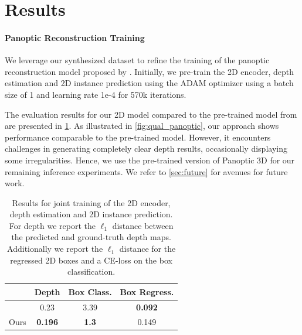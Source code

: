 \section{Results}
\label{sec:results}
\paragraph{Panoptic Reconstruction Training}

We leverage our synthesized dataset to refine the training of the panoptic reconstruction model proposed by \citet{dahnert2021panoptic}.
Initially, we pre-train the 2D encoder, depth estimation and 2D instance prediction using the ADAM optimizer \citep{kingma2014adam} using a batch size of 1 and learning rate 1e-4 for 570k iterations.

The evaluation results for our 2D model compared to the pre-trained model from \citet{dahnert2021panoptic} are presented in \cref{tab:2dresults}.
As illustrated in \cref{fig:qual_panoptic}, our approach shows performance comparable to the pre-trained model. However, it encounters challenges in generating completely clear depth results, occasionally displaying some irregularities.
Hence, we use the pre-trained version of Panoptic 3D for our remaining inference experiments. We refer to \cref{sec:future} for avenues for future work.
\begin{table}
  \centering
  \begin{tabular}{@{}lccc@{}}
    \toprule
     & Depth & Box Class. & Box Regress. \\
    \midrule
    \citet{dahnert2021panoptic} & 0.23 & 3.39 & \textbf{0.092}\\
    Ours & \textbf{0.196} & \textbf{1.3} & 0.149 \\
    \bottomrule
  \end{tabular}
  \caption{Results for joint training of the 2D encoder, depth estimation and 2D instance prediction. For depth we report the $\ell_1$ distance between the predicted and ground-truth depth maps. Additionally we report the $\ell_1$ distance for the regressed 2D boxes and a CE-loss on the box classification.  }
  \label{tab:2dresults}
\end{table}

